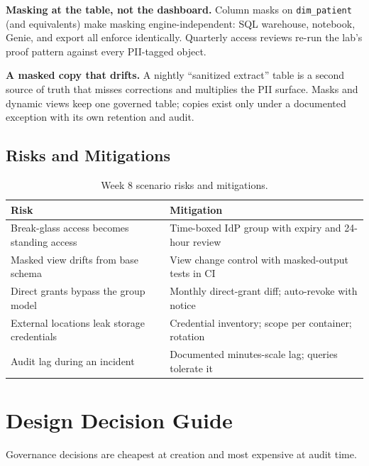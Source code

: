 \textbf{Masking at the table, not the dashboard.} Column masks on \texttt{dim\_patient} (and equivalents) make masking engine-independent: SQL warehouse, notebook, Genie, and export all enforce identically. Quarterly access reviews re-run the lab's proof pattern against every PII-tagged object.

\begin{pitfall}
\textbf{A masked copy that drifts.} A nightly ``sanitized extract'' table is a second source of truth that misses corrections and multiplies the PII surface. Masks and dynamic views keep one governed table; copies exist only under a documented exception with its own retention and audit.
\end{pitfall}

\subsection{Risks and Mitigations}
\begin{table}[H]
\centering
\small
\begin{tabular}{@{}p{4.6cm}p{7.6cm}@{}}
\toprule
\textbf{Risk} & \textbf{Mitigation} \\
\midrule
Break-glass access becomes standing access & Time-boxed IdP group with expiry and 24-hour review \\
Masked view drifts from base schema & View change control with masked-output tests in CI \\
Direct grants bypass the group model & Monthly direct-grant diff; auto-revoke with notice \\
External locations leak storage credentials & Credential inventory; scope per container; rotation \\
Audit lag during an incident & Documented minutes-scale lag; queries tolerate it \\
\bottomrule
\end{tabular}
\caption{Week 8 scenario risks and mitigations.}
\label{tab:ch8-risks}
\end{table}

\section{Design Decision Guide}
%
Governance decisions are cheapest at creation and most expensive at audit time.

